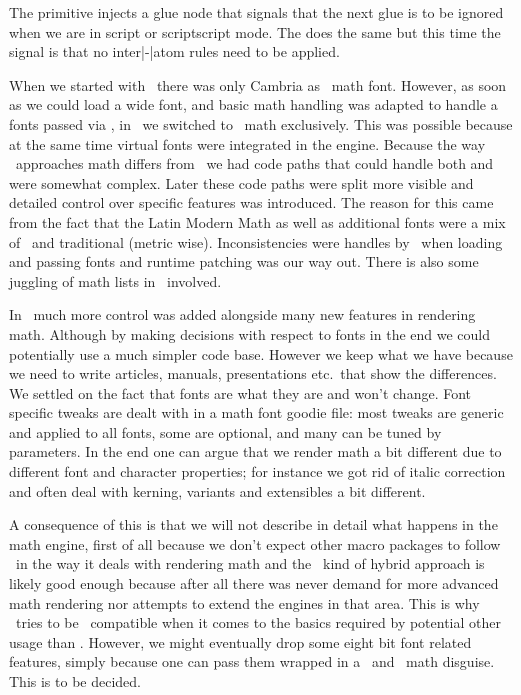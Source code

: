 The \type {\nonscript} primitive injects a glue node that signals that the next
glue is to be ignored when we are in script or scriptscript mode. The \typ
{\noatomruling} does the same but this time the signal is that no inter|-|atom
rules need to be applied.

\stopsection

\startsection[title={Fonts}]

When we started with \LUATEX\ there was only Cambria as \OPENTYPE\ math font.
However, as soon as we could load a wide font, and basic math handling was
adapted to handle a fonts passed via \LUA, in \CONTEXT\ we switched to \OPENTYPE\
math exclusively. This was possible because at the same time virtual fonts were
integrated in the engine. Because the way \TEX\ approaches math differs from
\OPENTYPE\ we had code paths that could handle both and were somewhat complex.
Later these code paths were split more visible and detailed control over specific
features was introduced. The reason for this came from the fact that the Latin
Modern Math as well as additional fonts were a mix of \OPENTYPE\ and traditional
(metric wise). Inconsistencies were handles by \CONTEXT\ when loading and passing
fonts and runtime patching was our way out. There is also some juggling of math
lists in \LUA\ involved.

In \LUAMETATEX\ much more control was added alongside many new features in
rendering math. Although by making decisions with respect to fonts in the end we
could potentially use a much simpler code base. However we keep what we have
because we need to write articles, manuals, presentations etc.\ that show the
differences. We settled on the fact that fonts are what they are and won't
change. Font specific tweaks are dealt with in a math font goodie file: most
tweaks are generic and applied to all fonts, some are optional, and many can be
tuned by parameters. In the end one can argue that we render math a bit different
due to different font and character properties; for instance we got rid of italic
correction and often deal with kerning, variants and extensibles a bit different.

A consequence of this is that we will not describe in detail what happens in the
math engine, first of all because we don't expect other macro packages to follow
\CONTEXT\ in the way it deals with rendering math and the \LUATEX\ kind of hybrid
approach is likely good enough because after all there was never demand for more
advanced math rendering nor attempts to extend the engines in that area. This is
why \LUAMETATEX\ tries to be \LUATEX\ compatible when it comes to the basics
required by potential other usage than \CONTEXT. However, we might eventually
drop some eight bit font related features, simply because one can pass them
wrapped in a \UNICODE\ and \OPENTYPE\ math disguise. This is to be decided.

